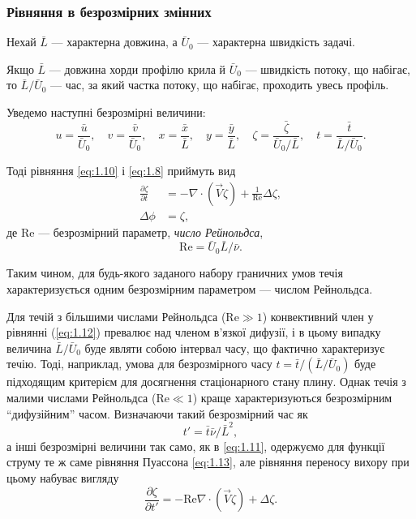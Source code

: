 \subsubsection{Рівняння в безрозмірних змінних}

Нехай $\bar L$ --- характерна довжина, а $\bar U_0$ --- характерна швидкість задачі.

\begin{example}
    Якщо $\bar L$ --- довжина хорди профілю крила й $\bar U_0$ --- швидкість потоку, що набігає, то $\bar L / \bar U_0$ --- час, за який частка потоку, що набігає, проходить увесь профіль. 
\end{example}

Уведемо наступні безрозмірні величини:
\begin{equation}
    \label{eq:1.11}
    u = \frac{\bar u}{\bar U_0}, \quad v = \frac{\bar v}{\bar U_0}, \quad x = \frac{\bar x}{\bar L}, \quad y = \frac{\bar y}{\bar L}, \quad  \zeta = \frac{\bar \zeta}{\bar U_0 / \bar L}, \quad t = \frac{\bar t}{\bar L / \bar U_0}.
\end{equation}

Тоді рівняння \ref{eq:1.10} і \ref{eq:1.8} приймуть вид
\begin{align}
    \label{eq:1.12}
    \frac{\partial \zeta}{\partial t} &= - \nabla \cdot (\vec V \zeta) + \frac{1}{\text{Re}} \Delta \zeta, \\
    \label{eq:1.13}
    \Delta \phi &= \zeta,
\end{align}
де $\text{Re}$ --- безрозмірний параметр, \textit{число Рейнольдса},
\begin{equation}
    \label{eq:1.14}
    \text{Re} = \bar U_0 \bar L / \bar \nu.
\end{equation}

Таким чином, для будь-якого заданого набору граничних умов течія характеризується одним безрозмірним параметром --- числом Рейнольдса. \medskip

Для течій з більшими числами Рейнольдса ($\text{Re} \gg 1$) конвективний член у рівнянні (\ref{eq:1.12}) превалює над членом в'язкої дифузії, і в цьому випадку величина $\bar L/\bar U_0$ буде являти собою інтервал часу, що фактично характеризує течію. Тоді, наприклад, умова для безрозмірного часу $t = \bar t / (\bar L / \bar U_0)$ буде підходящим критерієм для досягнення стаціонарного стану плину. Однак течія з малими числами Рейнольдса ($\text{Re} \ll 1$) краще характеризуються безрозмірним ``дифузійним'' часом. Визначаючи такий безрозмірний час як
\begin{equation}
    t' = \bar t \bar \nu / \bar L^2,
\end{equation}
а інші безрозмірні величини так само, як в \ref{eq:1.11}, одержуємо для функції струму те ж саме рівняння Пуассона \ref{eq:1.13}, але рівняння переносу вихору при цьому набуває вигляду
\begin{equation}
    \label{eq:1.16}
    \frac{\partial \zeta}{\partial t'} = - \text{Re} \nabla \cdot (\vec V \zeta) + \Delta \zeta.
\end{equation}

